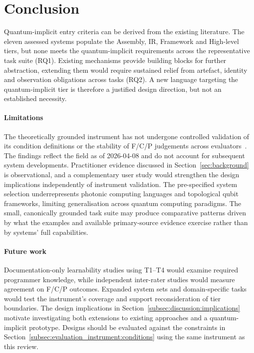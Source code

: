 \section{Conclusion}\label{sec:conclusion}
Quantum-implicit entry criteria can be derived from the existing literature.
The eleven assessed systems populate the Assembly, IR, Framework and High-level tiers, but none meets the quantum-implicit requirements across the representative task suite (RQ1).
Existing mechanisms provide building blocks for further abstraction, extending them would require sustained relief from artefact, identity and observation obligations across tasks (RQ2).
A new language targeting the quantum-implicit tier is therefore a justified design direction, but not an established necessity.

\paragraph{Limitations}
The theoretically grounded instrument has not undergone controlled validation of its condition definitions or the stability of F/C/P judgements across evaluators~\cite{Coblenz2021PLIERS,Myers2016PLUsabilitySIG}.
The findings reflect the field as of 2026-04-08 and do not account for subsequent system developments.
Practitioner evidence discussed in Section~\ref{sec:background} is observational, and a complementary user study would strengthen the design implications independently of instrument validation.
The pre-specified system selection underrepresents photonic computing languages and topological qubit frameworks, limiting generalisation across quantum computing paradigms.
The small, canonically grounded task suite may produce comparative patterns driven by what the examples and available primary-source evidence exercise rather than by systems' full capabilities.

\paragraph{Future work}
Documentation-only learnability studies using T1--T4 would examine required programmer knowledge, while independent inter-rater studies would measure agreement on F/C/P outcomes.
Expanded system sets and domain-specific tasks would test the instrument's coverage and support reconsideration of tier boundaries.
The design implications in Section~\ref{subsec:discussion:implications} motivate investigating both extensions to existing approaches and a quantum-implicit prototype.
Designs should be evaluated against the constraints in Section~\ref{subsec:evaluation_instrument:conditions} using the same instrument as this review.